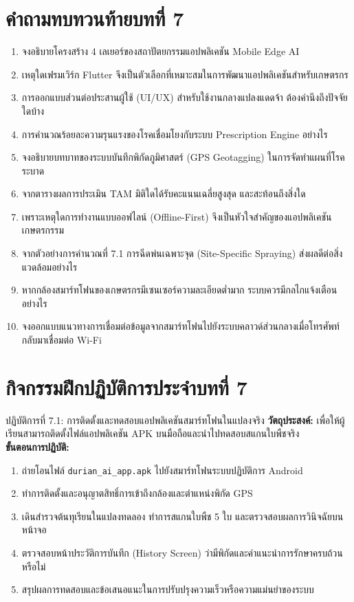 \section*{คำถามทบทวนท้ายบทที่ 7}
\begin{enumerate}[leftmargin=1.8em, itemsep=4pt]
    \item จงอธิบายโครงสร้าง 4 เลเยอร์ของสถาปัตยกรรมแอปพลิเคชัน Mobile Edge AI
    \item เหตุใดเฟรมเวิร์ก Flutter จึงเป็นตัวเลือกที่เหมาะสมในการพัฒนาแอปพลิเคชันสำหรับเกษตรกร
    \item การออกแบบส่วนต่อประสานผู้ใช้ (UI/UX) สำหรับใช้งานกลางแปลงแดดจ้า ต้องคำนึงถึงปัจจัยใดบ้าง
    \item การคำนวณร้อยละความรุนแรงของโรคเชื่อมโยงกับระบบ Prescription Engine อย่างไร
    \item จงอธิบายบทบาทของระบบบันทึกพิกัดภูมิศาสตร์ (GPS Geotagging) ในการจัดทำแผนที่โรคระบาด
    \item จากตารางผลการประเมิน TAM มิติใดได้รับคะแนนเฉลี่ยสูงสุด และสะท้อนถึงสิ่งใด
    \item เพราะเหตุใดการทำงานแบบออฟไลน์ (Offline-First) จึงเป็นหัวใจสำคัญของแอปพลิเคชันเกษตรกรรม
    \item จากตัวอย่างการคำนวณที่ 7.1 การฉีดพ่นเฉพาะจุด (Site-Specific Spraying) ส่งผลดีต่อสิ่งแวดล้อมอย่างไร
    \item หากกล้องสมาร์ทโฟนของเกษตรกรมีเซนเซอร์ความละเอียดต่ำมาก ระบบควรมีกลไกแจ้งเตือนอย่างไร
    \item จงออกแบบแนวทางการเชื่อมต่อข้อมูลจากสมาร์ทโฟนไปยังระบบคลาวด์ส่วนกลางเมื่อโทรศัพท์กลับมาเชื่อมต่อ Wi-Fi
\end{enumerate}

\section*{กิจกรรมฝึกปฏิบัติการประจำบทที่ 7}
\begin{nocodebox}{ปฏิบัติการที่ 7.1: การติดตั้งและทดสอบแอปพลิเคชันสมาร์ทโฟนในแปลงจริง}
\textbf{วัตถุประสงค์:} เพื่อให้ผู้เรียนสามารถติดตั้งไฟล์แอปพลิเคชัน APK บนมือถือและนำไปทดสอบสแกนใบพืชจริง\\
\textbf{ขั้นตอนการปฏิบัติ:}
\begin{enumerate}[leftmargin=1.4em, itemsep=2pt]
    \item ถ่ายโอนไฟล์ \texttt{durian\_ai\_app.apk} ไปยังสมาร์ทโฟนระบบปฏิบัติการ Android
    \item ทำการติดตั้งและอนุญาตสิทธิ์การเข้าถึงกล้องและตำแหน่งพิกัด GPS
    \item เดินสำรวจต้นทุเรียนในแปลงทดลอง ทำการสแกนใบพืช 5 ใบ และตรวจสอบผลการวินิจฉัยบนหน้าจอ
    \item ตรวจสอบหน้าประวัติการบันทึก (History Screen) ว่ามีพิกัดและคำแนะนำการรักษาครบถ้วนหรือไม่
    \item สรุปผลการทดสอบและข้อเสนอแนะในการปรับปรุงความเร็วหรือความแม่นยำของระบบ
\end{enumerate}
\end{nocodebox}
